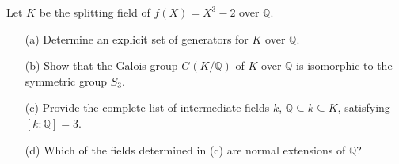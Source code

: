 \begin{prob}[S2001-Q2]
    Let \(K\) be the splitting field of \(f(X)=X^3-2\) over \(\mathbb{Q}\).
    \begin{itemize}
        \item[(a)] Determine an explicit set of generators for \(K\) over \(\mathbb{Q}\).
        \item[(b)] Show that the Galois group \(G(K/\mathbb{Q})\) of \(K\) over \(\mathbb{Q}\) is isomorphic to the symmetric group \(S_3\).
        \item[(c)] Provide the complete list of intermediate fields \(k\), \(\mathbb{Q} \subseteq k \subseteq K\), satisfying \([k:\mathbb{Q}]=3\).
        \item[(d)] Which of the fields determined in (c) are normal extensions of \(\mathbb{Q}\)?
    \end{itemize}
\end{prob}
